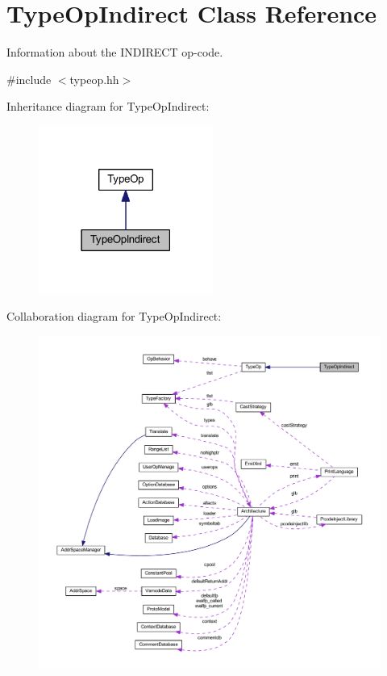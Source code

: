 \hypertarget{class_type_op_indirect}{}\section{Type\+Op\+Indirect Class Reference}
\label{class_type_op_indirect}


Information about the I\+N\+D\+I\+R\+E\+CT op-\/code.  




{\ttfamily \#include $<$typeop.\+hh$>$}



Inheritance diagram for Type\+Op\+Indirect\+:
\nopagebreak
\begin{figure}[H]
\begin{center}
\leavevmode
\includegraphics[width=162pt]{class_type_op_indirect__inherit__graph}
\end{center}
\end{figure}


Collaboration diagram for Type\+Op\+Indirect\+:
\nopagebreak
\begin{figure}[H]
\begin{center}
\leavevmode
\includegraphics[width=350pt]{class_type_op_indirect__coll__graph}
\end{center}
\end{figure}
